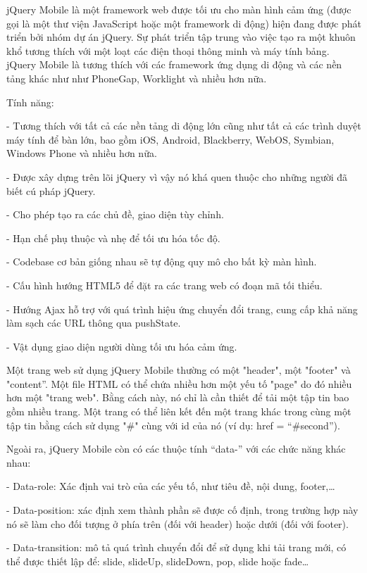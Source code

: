 jQuery Mobile là một framework web được tối ưu cho màn hình cảm ứng (được gọi là một thư viện JavaScript hoặc một framework di động) hiện đang được phát triển bởi nhóm dự án jQuery. Sự phát triển tập trung vào việc tạo ra một khuôn khổ tương thích với một loạt các điện thoại thông minh và máy tính bảng. jQuery Mobile là tương thích với các framework ứng dụng di động và các nền tảng khác như như PhoneGap, Worklight và nhiều hơn nữa.

Tính năng:

\quad - Tương thích với tất cả các nền tảng di động lớn cũng như tất cả các trình duyệt máy tính để bàn lớn, bao gồm iOS, Android, Blackberry, WebOS, Symbian, Windows Phone và nhiều hơn nữa.

\quad - Được xây dựng trên lõi jQuery vì vậy nó khá quen thuộc cho những người đã biết cú pháp jQuery.

\quad - Cho phép tạo ra các chủ đề, giao diện tùy chỉnh.

\quad - Hạn chế phụ thuộc và nhẹ để tối ưu hóa tốc độ.

\quad - Codebase cơ bản giống nhau sẽ tự động quy mô cho bất kỳ màn hình.

\quad - Cấu hình hướng HTML5 để đặt ra các trang web có đoạn mã tối thiểu.

\quad - Hướng Ajax hỗ trợ với quá trình hiệu ứng chuyển đổi trang, cung cấp khả năng làm sạch các URL thông qua pushState.

\quad - Vật dụng giao diện người dùng tối ưu hóa cảm ứng.

Một trang web sử dụng jQuery Mobile thường có một "header", một "footer" và "content”. Một file HTML có thể chứa nhiều hơn một yếu tố "page" do đó nhiều hơn một "trang web". Bằng cách này, nó chỉ là cần thiết để tải một tập tin bao gồm nhiều trang. Một trang có thể liên kết đến một trang khác trong cùng một tập tin bằng cách sử dụng "\#" cùng với id của nó (ví dụ: href = “\#second”).

Ngoài ra, jQuery Mobile còn có các thuộc tính “data-” với các chức năng khác nhau:

\quad - Data-role: Xác định vai trò của các yếu tố, như tiêu đề, nội dung, footer,…

\quad - Data-position: xác định xem thành phần sẽ được cố định, trong trường hợp này nó sẽ làm cho đối tượng ở phía trên (đối với header) hoặc dưới (đối với footer).

\quad - Data-transition: mô tả quá trình chuyển đổi để sử dụng khi tải trang mới, có thể được thiết lập để: slide, slideUp, slideDown, pop, slide hoặc fade…

